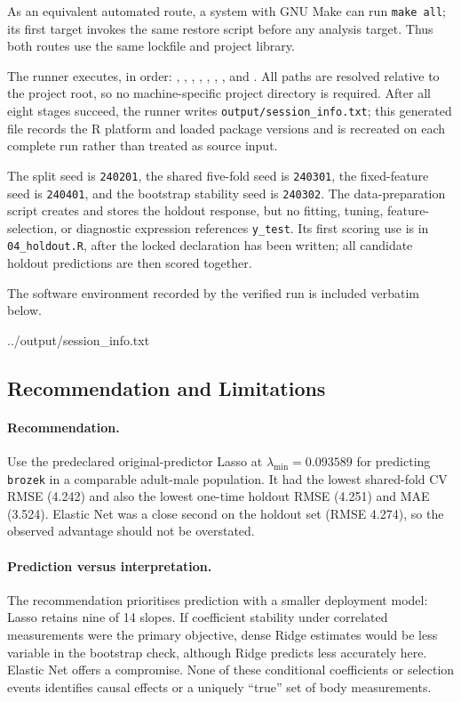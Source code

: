 As an equivalent automated route, a system with GNU Make can run
\texttt{make all}; its first target invokes the same restore script before any
analysis target.  Thus both routes use the same lockfile and project library.

The runner executes, in order:
, ,
, , ,
, , and
.  All paths are resolved relative to the project root,
so no machine-specific project directory is required.  After all eight stages
succeed, the runner writes \texttt{output/session\_info.txt}; this generated
file records the R platform and loaded package versions and is recreated on
each complete run rather than treated as source input.

The split seed is \texttt{240201}, the shared five-fold seed is
\texttt{240301}, the fixed-feature seed is \texttt{240401}, and the bootstrap
stability seed is \texttt{240302}.  The data-preparation script creates and
stores the holdout response, but no fitting, tuning, feature-selection, or
diagnostic expression references \texttt{y\_test}.  Its first scoring use is in
\texttt{04\_holdout.R}, after the locked declaration has been written; all
candidate holdout predictions are then scored together.

The software environment recorded by the verified run is included verbatim
below.


  {../output/session_info.txt}

\subsection{Recommendation and Limitations}
\label{sec:recommendation}

\paragraph{Recommendation.}
Use the predeclared original-predictor Lasso at
$\lambda_{\min}=0.093589$ for predicting \texttt{brozek} in a comparable
adult-male population.  It had the lowest shared-fold CV RMSE (4.242) and also
the lowest one-time holdout RMSE (4.251) and MAE (3.524).  Elastic Net was a
close second on the holdout set (RMSE 4.274), so the observed advantage should
not be overstated.

\paragraph{Prediction versus interpretation.}
The recommendation prioritises prediction with a smaller deployment model:
Lasso retains nine of 14 slopes.  If coefficient stability under correlated
measurements were the primary objective, dense Ridge estimates would be less
variable in the bootstrap check, although Ridge predicts less accurately here.
Elastic Net offers a compromise.  None of these conditional coefficients or
selection events identifies causal effects or a uniquely ``true'' set of body
measurements.

